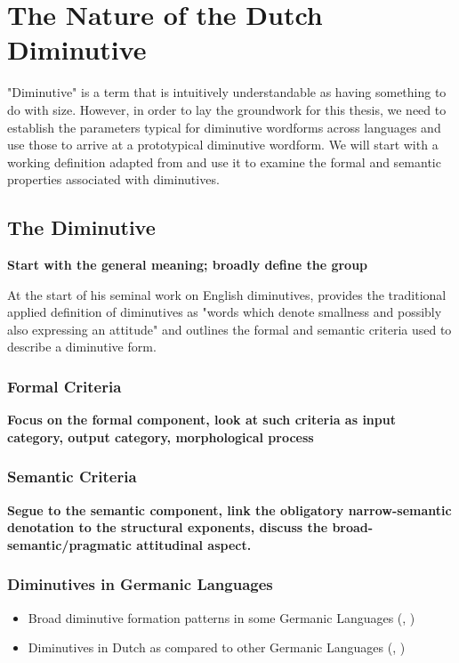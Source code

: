 \chapter{The Nature of the Dutch Diminutive}\label{background}
"Diminutive" is a term that is intuitively understandable as having something to do with size. However, in order to lay the groundwork for this thesis, we need to establish the parameters typical for diminutive wordforms across languages and use those to arrive at a prototypical diminutive wordform. We will start with a working definition adapted from \cite{Schneider+2003} and use it to examine the formal and semantic properties associated with diminutives. 

\section{The Diminutive}

\textbf{Start with the general meaning; broadly define the group}

At the start of his seminal \citeyear{Schneider+2003} work on English diminutives, \citeauthor{Schneider+2003} provides the traditional applied definition of diminutives as "words which denote smallness and possibly also expressing an attitude" \parencite[p.4]{Schneider+2003} and outlines the formal and semantic criteria used to describe a diminutive form. 

\subsection{Formal Criteria}
\textbf{Focus on the formal  component, look at such criteria as input category, output category, morphological process}

\subsection{Semantic Criteria}
\textbf{Segue to the semantic component, link the obligatory narrow-semantic denotation to the structural exponents, discuss the broad-semantic/pragmatic attitudinal aspect.}

\subsection{Diminutives in Germanic Languages}
\begin{itemize}
\item Broad diminutive formation patterns in some Germanic Languages (\cite{Alexiadou+Lohndal}, \cite{Schneider+2003})
\item Diminutives in Dutch as compared to other Germanic Languages (\cite{Booij+2000}, \cite{DeBelder+2022}) 
\end{itemize}


